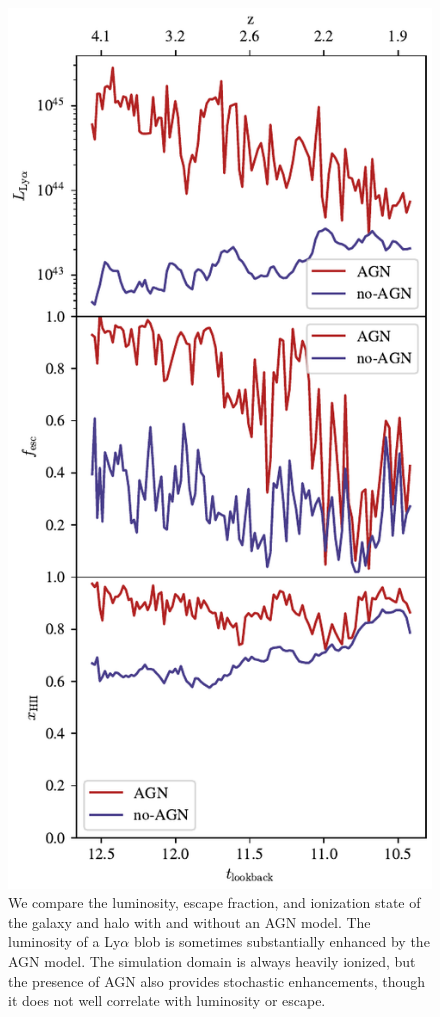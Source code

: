 \begin{figure}
    \centering
    \includegraphics[width=\textwidth,height=\textheight,keepaspectratio]{figures/agn_comparison.pdf}
    \caption{
        We compare the luminosity, escape fraction, and ionization state of the galaxy and halo with and without an AGN model.
        The luminosity of a Ly$\alpha$ blob is sometimes substantially enhanced by the AGN model.
        The simulation domain is always heavily ionized, but the presence of AGN also provides stochastic enhancements, though it does not well correlate with luminosity or escape.
    }
    \label{fig:agn_comparison}
\end{figure}

